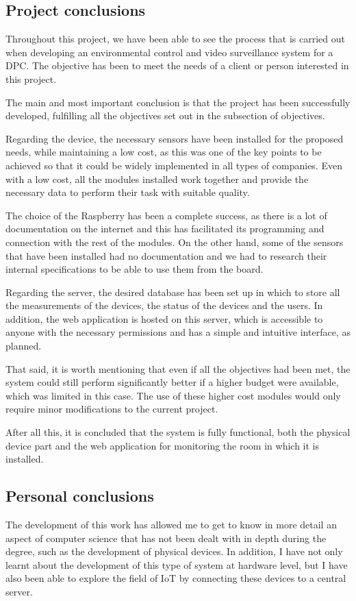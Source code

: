 \subsection{Project conclusions}\label{subsec:project-conclusions}
Throughout this project, we have been able to see the process that is carried out when developing an environmental control and video surveillance system for a DPC. The objective has been to meet the needs of a client or person interested in this project.

The main and most important conclusion is that the project has been successfully developed, fulfilling all the objectives set out in the subsection of objectives.

Regarding the device, the necessary sensors have been installed for the proposed needs, while maintaining a low cost, as this was one of the key points to be achieved so that it could be widely implemented in all types of companies. Even with a low cost, all the modules installed work together and provide the necessary data to perform their task with suitable quality.

The choice of the Raspberry has been a complete success, as there is a lot of documentation on the internet and this has facilitated its programming and connection with the rest of the modules. On the other hand, some of the sensors that have been installed had no documentation and we had to research their internal specifications to be able to use them from the board.

Regarding the server, the desired database has been set up in which to store all the measurements of the devices, the status of the devices and the users. In addition, the web application is hosted on this server, which is accessible to anyone with the necessary permissions and has a simple and intuitive interface, as planned.

That said, it is worth mentioning that even if all the objectives had been met, the system could still perform significantly better if a higher budget were available, which was limited in this case. The use of these higher cost modules would only require minor modifications to the current project.

After all this, it is concluded that the system is fully functional, both the physical device part and the web application for monitoring the room in which it is installed.

\subsection{Personal conclusions}\label{subsec:personal-conclusions}
The development of this work has allowed me to get to know in more detail an aspect of computer science that has not been dealt with in depth during the degree, such as the development of physical devices. In addition, I have not only learnt about the development of this type of system at hardware level, but I have also been able to explore the field of IoT by connecting these devices to a central server.

